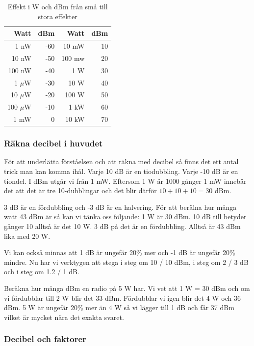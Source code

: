 \begin{table}[!h]
	\centering
 	\begin{tabular}{rr|rr}
	      Watt & dBm &   Watt & dBm \\ \hline
	      1 nW & -60 &  10 mW &  10 \\
	     10 nW & -50 & 100 mw &  20 \\
	    100 nW & -40 &    1 W &  30 \\
	  1 $\mu$W & -30 &   10 W &  40 \\
	 10 $\mu$W & -20 &  100 W &  50 \\
	100 $\mu$W & -10 &   1 kW &  60 \\
	      1 mW &   0 &  10 kW &  70
	\end{tabular}
	\caption{Effekt i W och dBm från små till stora effekter}
	\label{tab:effekt-dbm}
\end{table}


\subsubsection{Räkna decibel i huvudet}

För att underlätta förståelsen och att räkna med decibel så finns det ett antal trick man kan komma ihål. Varje 10 dB är en tiodubbling. Varje -10 dB är en tiondel. I dBm utgår vi från 1 mW. Eftersom 1 W är 1000 gånger 1 mW innebär det att det är tre 10-dubblingar och det blir därför $10+10+10=30$ dBm.

3 dB är en fördubbling och -3 dB är en halvering. För att berälna hur många watt 43 dBm är så kan vi tänka oss följande: 1 W är 30 dBm. 10 dB till betyder gånger 10 alltså är det 10 W. 3 dB på det är en fördubbling. Alltså är 43 dBm lika med 20 W. 

Vi kan också minnas att 1 dB är ungefär 20\% mer och -1 dB är ungefär 20\% mindre. Nu har vi verktygen att stega i steg om 10 / 10 dBm, i steg om 2 / 3 dB och i steg om 1.2 / 1 dB.

Beräkna hur många dBm en radio på 5 W har. Vi vet att 1 W = 30 dBm och om vi fördubblar till 2 W blir det 33 dBm. Fördubblar vi igen blir det 4 W och 36 dBm. 5 W är ungefär 20\% mer än 4 W så vi lägger till 1 dB och får 37 dBm vilket är mycket nära det exakta svaret.

\subsubsection{Decibel och faktorer}

